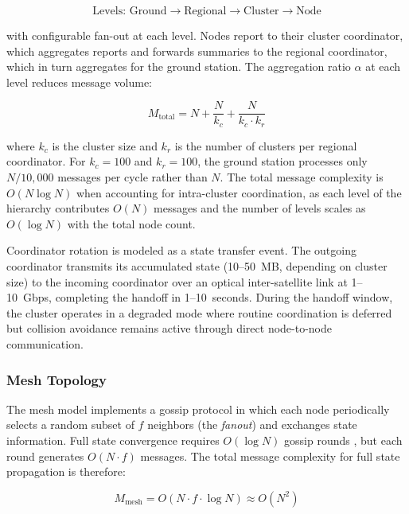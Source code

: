 \documentclass[journal]{IEEEtran}
\begin{document}
\begin{equation}
    \text{Levels: Ground} \to \text{Regional} \to \text{Cluster} \to \text{Node}
    \label{eq:hierarchy}
\end{equation}

\noindent with configurable fan-out at each level. Nodes report to their cluster coordinator, which aggregates reports and forwards summaries to the regional coordinator, which in turn aggregates for the ground station. The aggregation ratio $\alpha$ at each level reduces message volume:

\begin{equation}
    M_{\text{total}} = N + \frac{N}{k_c} + \frac{N}{k_c \cdot k_r}
    \label{eq:hierarchical_messages}
\end{equation}

\noindent where $k_c$ is the cluster size and $k_r$ is the number of clusters per regional coordinator. For $k_c = 100$ and $k_r = 100$, the ground station processes only $N/10{,}000$ messages per cycle rather than $N$. The total message complexity is $O(N \log N)$ when accounting for intra-cluster coordination, as each level of the hierarchy contributes $O(N)$ messages and the number of levels scales as $O(\log N)$ with the total node count.

Coordinator rotation is modeled as a state transfer event. The outgoing coordinator transmits its accumulated state (10--50~MB, depending on cluster size) to the incoming coordinator over an optical inter-satellite link at 1--10~Gbps, completing the handoff in 1--10~seconds. During the handoff window, the cluster operates in a degraded mode where routine coordination is deferred but collision avoidance remains active through direct node-to-node communication.

\subsubsection{Mesh Topology}

The mesh model implements a gossip protocol in which each node periodically selects a random subset of $f$ neighbors (the \emph{fanout}) and exchanges state information. Full state convergence requires $O(\log N)$ gossip rounds \cite{demers_gossip}, but each round generates $O(N \cdot f)$ messages. The total message complexity for full state propagation is therefore:

\begin{equation}
    M_{\text{mesh}} = O(N \cdot f \cdot \log N) \approx O(N^2)
    \label{eq:mesh_messages}
\end{equation}
\end{document}
